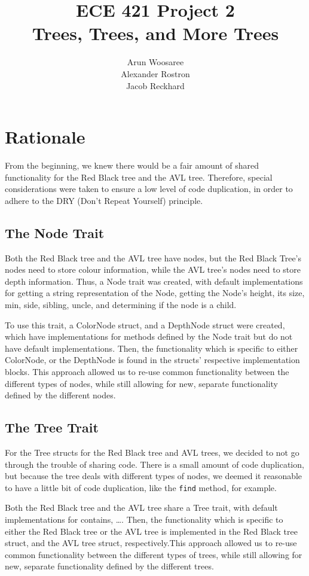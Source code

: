 \documentclass[letterpaper]{article}
\title{ECE 421 Project 2\\
Trees, Trees, and More Trees}
\author{Arun Woosaree\\
Alexander Rostron\\
Jacob Reckhard
}
\begin{document}
\maketitle %

\section{Rationale}
From the beginning, we knew there would be a fair amount of shared functionality
for the Red Black tree and the AVL tree. Therefore, special considerations were
taken to ensure a low level of code duplication, in order to adhere to the DRY
(Don't Repeat Yourself) principle.

\subsection{The Node Trait}\label{dry}
Both the Red Black tree and the AVL tree have nodes, but the Red Black Tree's
nodes need to store colour information, while the AVL tree's nodes need to store
depth information. Thus, a Node trait was created, with default implementations
for getting a string representation of the Node, getting the Node's height, its
size, min, side, sibling, uncle, and determining if the node is a child.

To use this trait, a ColorNode struct, and a DepthNode struct were created,
which have implementations for methods defined by the Node trait but do not have
default implementations. Then, the functionality which is specific to either
ColorNode, or the DepthNode is found in the structs' respective implementation
blocks. This approach allowed us to re-use common functionality between the
different types of nodes, while still allowing for new, separate functionality
defined by the different nodes. 

\subsection{The Tree Trait}
For the Tree structs for the Red Black tree and AVL trees, we decided to not go
through the trouble of sharing code. There is a small amount of code
duplication, but because the tree deals with different types of nodes, we deemed
it reasonable to have a little bit of code duplication, like the \texttt{find}
method, for example.

Both the Red Black tree and the AVL tree share a Tree trait, with default
implementations for contains, \dots \todo{}. Then, the functionality which is
specific to either the Red Black tree or the AVL tree is implemented in the Red
Black tree struct, and the AVL tree struct, respectively.This approach allowed
us to re-use common functionality between the
different types of trees, while still allowing for new, separate functionality
defined by the different trees.
\end{document}
